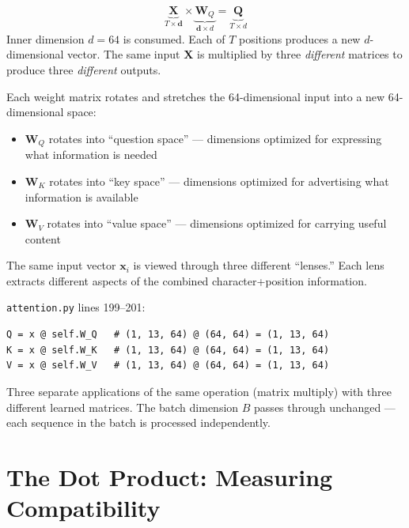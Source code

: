 \documentclass[11pt, a4paper]{article}
\newcommand{\vx}{\bm{x}}
\newcommand{\mW}{\bm{W}}
\newcommand{\mQ}{\bm{Q}}
\newcommand{\mX}{\bm{X}}
\begin{document}
\begin{dimcheck}
\[
\underbrace{\mX}_{T \times \mathbf{d}} \times \underbrace{\mW_Q}_{\mathbf{d} \times d} = \underbrace{\mQ}_{T \times d}
\]
Inner dimension $d=64$ is consumed. Each of $T$ positions produces a new $d$-dimensional vector.
The same input $\mX$ is multiplied by three \textit{different} matrices to produce three
\textit{different} outputs.
\end{dimcheck}

\begin{intuition}
Each weight matrix rotates and stretches the 64-dimensional input into a new
64-dimensional space:
\begin{itemize}[nosep]
  \item $\mW_Q$ rotates into ``question space'' --- dimensions optimized for expressing what information is needed
  \item $\mW_K$ rotates into ``key space'' --- dimensions optimized for advertising what information is available
  \item $\mW_V$ rotates into ``value space'' --- dimensions optimized for carrying useful content
\end{itemize}
The same input vector $\vx_i$ is viewed through three different ``lenses.''
Each lens extracts different aspects of the combined character+position information.
\end{intuition}

\begin{transformer}
\texttt{attention.py} lines 199--201:
\begin{verbatim}
Q = x @ self.W_Q   # (1, 13, 64) @ (64, 64) = (1, 13, 64)
K = x @ self.W_K   # (1, 13, 64) @ (64, 64) = (1, 13, 64)
V = x @ self.W_V   # (1, 13, 64) @ (64, 64) = (1, 13, 64)
\end{verbatim}
Three separate applications of the same operation (matrix multiply) with three
different learned matrices. The batch dimension $B$ passes through unchanged ---
each sequence in the batch is processed independently.
\end{transformer}

\section{The Dot Product: Measuring Compatibility}
\end{document}
